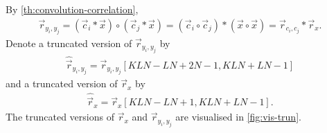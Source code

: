 \documentclass[a4paper, openany, oneside]{memoir}
\begin{document}
By \cref{th:convolution-correlation},
\begin{align*}
    \vec{r}_{y_i,y_j} =(\vec{c}_i \ast \vec{x}) \circ (\vec{c}_j \ast \vec{x}) = (\vec{c}_i \circ \vec{c}_j) \ast (\vec{x} \circ \vec{x}) = \vec{r}_{c_i,c_j} \ast \vec{r}_x.
\end{align*}
Denote a truncated version of $\vec{r}_{y_i,y_j}$ by
\begin{align*}
    \hat{\vec{r}}_{y_i,y_j} = \vec{r}_{y_i,y_j}[KLN-LN+2N-1,KLN+LN-1]
\end{align*}
and a truncated version of $\vec{r}_x$ by
\begin{align*}
    \hat{\vec{r}}_x = \vec{r}_x [KLN-LN+1,KLN+LN-1].
\end{align*}
The truncated versions of $\vec{r}_x$ and $\vec{r}_{y_i,y_j}$ are visualised in \cref{fig:vis-trun}.
\usetikzlibrary{decorations.pathreplacing}
\end{document}
